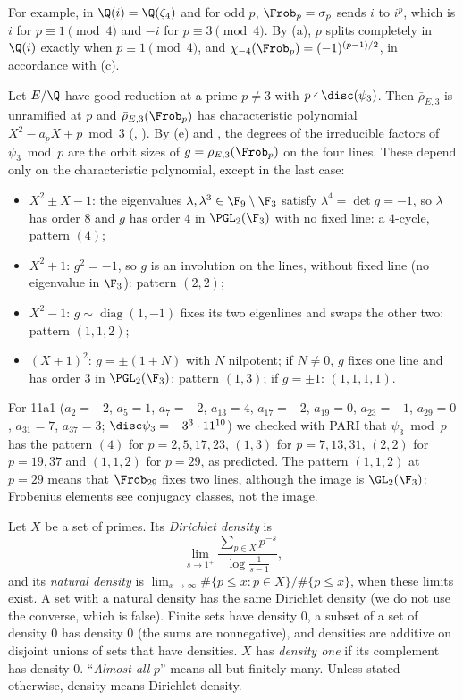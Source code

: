 For example, in $\Q(i)=\Q(\zeta_4)$ and for odd $p$, $\Frob_p=\sigma_p$ sends $i$ to $i^p$, which is $i$ for $p\equiv1\pmod4$ and $-i$ for $p\equiv3\pmod4$. By (a),
$p$ splits completely in $\Q(i)$ exactly when $p\equiv1\pmod4$, and $\chi_{-4}(\Frob_p)=(-1)^{(p-1)/2}$, in accordance with (c).

\begin{example}\label{ex:galois:frobenius-on-lines}
Let $E/\Q$ have good reduction at a prime $p\ne3$ with $p\nmid\disc(\psi_3)$. Then $\bar\rho_{E,3}$ is unramified at $p$ and $\bar\rho_{E,3}(\Frob_p)$ has characteristic
polynomial $X^2-a_pX+p\bmod3$ (, ). By (e) and , the degrees of the
irreducible factors of $\psi_3\bmod p$ are the orbit sizes of $g=\bar\rho_{E,3}(\Frob_p)$ on the four lines. These depend only on the characteristic polynomial, except
in the last case:
\begin{itemize}
\item $X^2\pm X-1$: the eigenvalues $\lambda,\lambda^3\in\F_9\setminus\F_3$ satisfy $\lambda^4=\det g=-1$, so $\lambda$ has order $8$ and $g$ has order $4$ in $\PGL_2(\F_3)$ with
no fixed line: a $4$-cycle, pattern $(4)$;
\item $X^2+1$: $g^2=-1$, so $g$ is an involution on the lines, without fixed line (no eigenvalue in $\F_3$): pattern $(2,2)$;
\item $X^2-1$: $g\sim\operatorname{diag}(1,-1)$ fixes its two eigenlines and swaps the other two: pattern $(1,1,2)$;
\item $(X\mp1)^2$: $g=\pm(1+N)$ with $N$ nilpotent; if $N\ne0$, $g$ fixes one line and has order $3$ in $\PGL_2(\F_3)$: pattern $(1,3)$; if $g=\pm1$: $(1,1,1,1)$.
\end{itemize}
For 11a1 ($a_2=-2$, $a_5=1$, $a_7=-2$, $a_{13}=4$, $a_{17}=-2$, $a_{19}=0$, $a_{23}=-1$, $a_{29}=0$, $a_{31}=7$, $a_{37}=3$; $\disc\psi_3=-3^3\cdot11^{10}$) we checked with PARI that
$\psi_3\bmod p$ has the pattern $(4)$ for $p=2,5,17,23$, $(1,3)$ for $p=7,13,31$, $(2,2)$ for $p=19,37$ and $(1,1,2)$ for $p=29$, as predicted. The pattern $(1,1,2)$ at
$p=29$ means that $\Frob_{29}$ fixes two lines, although the image is $\GL_2(\F_3)$: Frobenius elements see conjugacy classes, not the image.
\end{example}

\begin{definition}[Density]\label{def:galois:density}
Let $X$ be a set of primes. Its \emph{Dirichlet density} is
\[
\lim_{s\to1^+}\frac{\sum_{p\in X}p^{-s}}{\log\frac1{s-1}},
\]
and its \emph{natural density} is $\lim_{x\to\infty}\#\{p\le x:p\in X\}/\#\{p\le x\}$, when these limits exist. A set with a natural density has the same Dirichlet density
(we do not use the converse, which is false). Finite sets have density $0$, a subset of a set of density $0$ has density $0$ (the sums are nonnegative), and densities are
additive on disjoint unions of sets that have densities. $X$ has \emph{density one} if its complement has density $0$. ``\emph{Almost all} $p$'' means all but finitely
many. Unless stated otherwise, density means Dirichlet density.
\end{definition}


